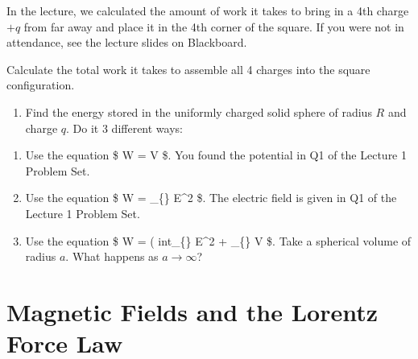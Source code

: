 \documentclass[
  letterpaper,
  DIV=11,
  numbers=noendperiod]{scrreprt}
\providecommand{\tightlist}{%
  \setlength{\itemsep}{0pt}\setlength{\parskip}{0pt}}\usepackage{longtable,booktabs,array}
\begin{document}
In the lecture, we calculated the amount of work it takes to bring in a
4th charge \(+q\) from far away and place it in the 4th corner of the
square. If you were not in attendance, see the lecture slides on
Blackboard.

Calculate the total work it takes to assemble all 4 charges into the
square configuration.

\begin{enumerate}
\def\labelenumi{\arabic{enumi})}
\setcounter{enumi}{1}
\tightlist
\item
  Find the energy stored in the uniformly charged solid sphere of radius
  \(R\) and charge \(q\). Do it 3 different ways:
\end{enumerate}

\begin{enumerate}
\def\labelenumi{(\alph{enumi})}
\item
  Use the equation \$ W =  \int \rho V  \tau \$.
  You found the potential in Q1 of the Lecture 1 Problem Set.
\item
  Use the equation \$ W = 
  \int\_\{\} E\^{}2  \tau \$. The electric
  field is given in Q1 of the Lecture 1 Problem Set.
\item
  Use the equation \$ W =  \left(
  int\_\{\} E\^{}2  \tau + \oint\_\{\} V
   \cdot {}  \$. Take a
  spherical volume of radius \(a\). What happens as
  \(a \rightarrow \infty\)?
\end{enumerate}


\chapter{Magnetic Fields and the Lorentz Force
Law}\label{magnetic-fields-and-the-lorentz-force-law}

\newcommand{\l}{\mathrm{\mathbf{l}}}
\newcommand{\E}{\mathrm{\mathbf{E}}}
\newcommand{\F}{\mathrm{\mathbf{F}}}
\newcommand{\r}{\mathrm{\mathbf{r}}}
\newcommand{\B}{\mathrm{\mathbf{B}}}
\newcommand{\x}{\mathrm{\mathbf{x}}}
\newcommand{\y}{\mathrm{\mathbf{y}}}
\newcommand{\z}{\mathrm{\mathbf{z}}}
\newcommand{\v}{\mathrm{\mathbf{v}}}

\newcommand{\a}{\mathrm{\mathbf{a}}}
\newcommand{\b}{\mathrm{\mathbf{b}}}
\newcommand{\I}{\mathrm{\mathbf{I}}}
\newcommand{\l}{\mathrm{\mathbf{l}}}
\end{document}
